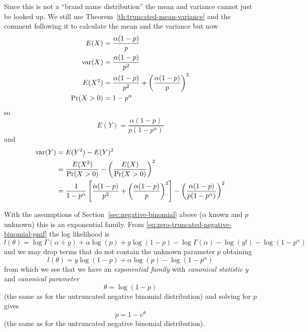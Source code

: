 Since this is not a ``brand name distribution'' the mean and variance
cannot just be looked up.
We still use Theorem~\ref{th:truncated-mean-variance}
and the comment following it to calculate the mean and the variance but now
\begin{align*}
   E(X) & = \frac{\alpha (1 - p)}{p}
   \\
   \operatorname{var}(X) & = \frac{\alpha (1 - p)}{p^2}
   \\
   E(X^2) & =
   \frac{\alpha (1 - p)}{p^2} + \left( \frac{\alpha (1 - p)}{p} \right)^2
   \\
   \Pr(X > 0) & = 1 - p^\alpha
\end{align*}
so
$$
   E(Y) = \frac{\alpha (1 - p)}{p (1 - p^\alpha)}
$$
and
\begin{align*}
   \operatorname{var}(Y)
   & = 
   E(Y^2) - E(Y)^2
   \\
   & = 
   \frac{E(X^2)}{\Pr(X > 0)} - \left(\frac{E(X)}{\Pr(X > 0)}\right)^2
   \\
   & =
   \frac{1}{1 - p^\alpha}
   \left[ \frac{\alpha (1 - p)}{p^2} + \left( \frac{\alpha (1 - p)}{p}
   \right)^2 \right]
   -
   \left( \frac{\alpha (1 - p)}{p (1 - p^\alpha)} \right)^2
\end{align*}

With the assumptions of Section~\ref{sec:negative-binomial} above
($\alpha$ known and $p$ unknown) this is an exponential family.
From \eqref{eq:zero-truncated-negative-binomial-pmf} the log likelihood is
$$
   l(\theta)
   =
   \log \Gamma(\alpha + y) + \alpha \log(p) + y \log(1-p)
   - \log \Gamma(\alpha) - \log(y!) - \log(1 - p^\alpha)
$$
and we may drop terms that do not contain the unknown parameter $p$ obtaining
$$
   l(\theta)
   =
   y \log(1-p) + \alpha \log(p) - \log(1 - p^\alpha)
$$
from which we see that we have an \emph{exponential family} with
\emph{canonical statistic} $y$ and \emph{canonical parameter}
$$
   \theta = \log(1 - p)
$$
(the same as for the untruncated negative binomial distribution)
and solving for $p$ gives
$$
   p = 1 - e^\theta
$$
(the same as for the untruncated negative binomial distribution).

